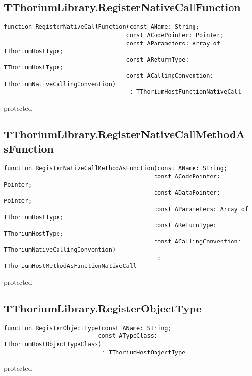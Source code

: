 \subsection{TThoriumLibrary.RegisterNativeCallFunction}
\label{thoriumcorepkg:thorium:tthoriumlibrary:registernativecallfunction}
\begin{FPCList}
\Declaration 

\begin{verbatim}
function RegisterNativeCallFunction(const AName: String;
                                   const ACodePointer: Pointer;
                                   const AParameters: Array of TThoriumHostType;
                                   const AReturnType: TThoriumHostType;
                                   const ACallingConvention: TThoriumNativeCallingConvention)
                                    : TThoriumHostFunctionNativeCall
\end{verbatim}
\Visibility
protected
\end{FPCList}
\subsection{TThoriumLibrary.RegisterNativeCallMethodAsFunction}
\label{thoriumcorepkg:thorium:tthoriumlibrary:registernativecallmethodasfunction}
\begin{FPCList}
\Declaration 

\begin{verbatim}
function RegisterNativeCallMethodAsFunction(const AName: String;
                                           const ACodePointer: Pointer;
                                           const ADataPointer: Pointer;
                                           const AParameters: Array of TThoriumHostType;
                                           const AReturnType: TThoriumHostType;
                                           const ACallingConvention: TThoriumNativeCallingConvention)
                                            : TThoriumHostMethodAsFunctionNativeCall
\end{verbatim}
\Visibility
protected
\end{FPCList}
\subsection{TThoriumLibrary.RegisterObjectType}
\label{thoriumcorepkg:thorium:tthoriumlibrary:registerobjecttype}
\begin{FPCList}
\Declaration 

\begin{verbatim}
function RegisterObjectType(const AName: String;
                           const ATypeClass: TThoriumHostObjectTypeClass)
                            : TThoriumHostObjectType
\end{verbatim}
\Visibility
protected
\end{FPCList}
